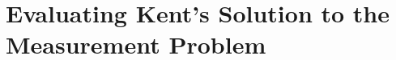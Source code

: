 \chapter{Evaluating Kent's Solution to the Measurement Problem\label{chp2}}
\begin{comment}

In the previous chapter, we saw how a denial of the Copenhagen interpretation of quantum mechanics and a denial of hidden variables leads fairly naturally to a so-called Many-Worlds interpretation of quantum mechanics. However, the Many-Worlds interpretation seems to be radically opposed to the view that we can make common sense truth claims about the physical world. A strategy among some philosophers of physics who do not wish to endorse the Many-Worlds interpretation is therefore to reexamine the assumptions that lead to Bell's Inequality. One of these assumptions will have to be discarded since Bell's Inequality is experimentally violated. The false assumption that is used to prove Bell's Inequality is sometimes referred to as \textbf{the culprit}. We therefore need to identify the culprit, that is, we need to decide which assumption we should discard while keeping in mind that we wish to maintain a theory that is compatible with the experimental findings of quantum physics and special relativity.

Shimony noticed that there are two key assumptions in the proof of Bell's Inequality that might be identified as the culprit. He refers to one assumption as {Outcome Independence} (OI), and to the other assumption as {Parameter Independence} (PI).\footnote{See \cite[146-147]{Shimony86}.} Shimony argued that if we only denied OI, then the proof of Bell's Inequality would fail to go through. Yet by continuing to assume PI, there is a sense in which special relativity is not obviously violated. Shimony therefore thought that denying OI and assuming PI was sufficient to ensure peaceful coexistence between quantum theory and special relativity. In other words, Shimony thought OI was the culprit. 

Butterfield,\footnote{See \cite{Butterfield}.} however, argues that although PI is a necessary assumption if there is to be peaceful coexistence between quantum theory and special relativity, PI together with the denial of OI independence is not sufficient to ensure peaceful coexistence. Butterfield thinks this because Shimony fails to offer an account of what an outcome is. As mentioned in the previous chapter,\footnote{See section \ref{probOutcomes}.} the important problem of outcomes was highlighted by d'Espagnat.
It is this omission on Shimony's part that motivates Butterfield to explore whether Kent's interpretation of quantum physics provides what is lacking in Shimony's account. 


\end{comment}
